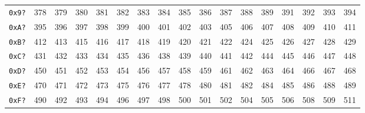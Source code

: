{\begin{tabular}{|r|r|r|r|r|r|r|r|r|r|r|r|r|r|r|r|r|}
\texttt{0x9?} & 378 & 379 & 380 & 381 & 382 & 383 & 384 & 385 & 386 & 387 & 388 & 389 & 391 & 392 & 393 & 394 \\
\texttt{0xA?} & 395 & 396 & 397 & 398 & 399 & 400 & 401 & 402 & 403 & 405 & 406 & 407 & 408 & 409 & 410 & 411 \\
\texttt{0xB?} & 412 & 413 & 415 & 416 & 417 & 418 & 419 & 420 & 421 & 422 & 424 & 425 & 426 & 427 & 428 & 429 \\
\texttt{0xC?} & 431 & 432 & 433 & 434 & 435 & 436 & 438 & 439 & 440 & 441 & 442 & 444 & 445 & 446 & 447 & 448 \\
\texttt{0xD?} & 450 & 451 & 452 & 453 & 454 & 456 & 457 & 458 & 459 & 461 & 462 & 463 & 464 & 466 & 467 & 468 \\
\texttt{0xE?} & 470 & 471 & 472 & 473 & 475 & 476 & 477 & 478 & 480 & 481 & 482 & 484 & 485 & 486 & 488 & 489 \\
\texttt{0xF?} & 490 & 492 & 493 & 494 & 496 & 497 & 498 & 500 & 501 & 502 & 504 & 505 & 506 & 508 & 509 & 511 \\
\hline
\end{tabular}
}

\clearpage

